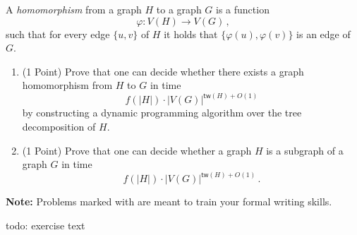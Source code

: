 \documentclass{uebung_cs}
\begin{document}
\begin{exercise}%
A \emph{homomorphism} from a graph $H$ to a graph $G$ is a function \[\varphi:V(H)\rightarrow V(G) \,, \] such that for every edge $\{u,v\}$ of $H$ it holds that $\{\varphi(u),\varphi(v)\}$ is an edge of $G$. 
\begin{enumerate}
\item (1 Point) Prove that one can decide whether there exists a graph homomorphism from $H$ to $G$ in time
\[f(|H|)\cdot |V(G)|^{\mathsf{tw}(H)+O(1)} \]
by constructing a dynamic programming algorithm over the tree decomposition of $H$.
\item (1 Point) Prove that one can decide whether a graph $H$ is a subgraph of a graph $G$ in time
\[f(|H|)\cdot |V(G)|^{\mathsf{tw}(H)+O(1)} \,.\]
\end{enumerate}
\end{exercise}

\newpage
\textbf{Note:} Problems marked with \schriftlich are meant to train your formal writing skills.

\begin{exercise}
  todo: exercise text
\end{exercise}
\end{document}
